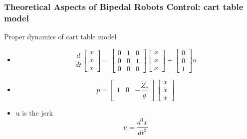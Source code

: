 \documentclass{beamer}
\begin{document}
	\begin{frame}
		\frametitle{Theoretical Aspects of Bipedal Robots Control: cart table model}
		\begin{block}{Proper dynamics of cart table model}
			\begin{itemize}
				\item
					\begin{equation}
						\dfrac{d}{dt} \begin{bmatrix} x \\ \dot{x} \\ \ddot{x} \end{bmatrix} = \begin{bmatrix} 0 & 1 & 0 \\ 0 & 0 & 1 \\ 0 & 0& 0 \end{bmatrix}  \begin{bmatrix} x \\ \dot{x} \\ \ddot{x} \end{bmatrix} + \begin{bmatrix} 0 \\0 \\ 1 \end{bmatrix} u
					\end{equation}
				\item
					\begin{equation}
						p = \begin{bmatrix} 1 & 0  & - \dfrac{Z_c}{g} \end{bmatrix}\begin{bmatrix} x \\ \dot{x} \\ \ddot{x} \end{bmatrix}
					\end{equation}
				\item
					u is the jerk
					\begin{equation}
						u = \dfrac{d^3 x}{dt^3}
					\end{equation}
			\end{itemize}
		\end{block}
	\end{frame}
	
\end{document}

